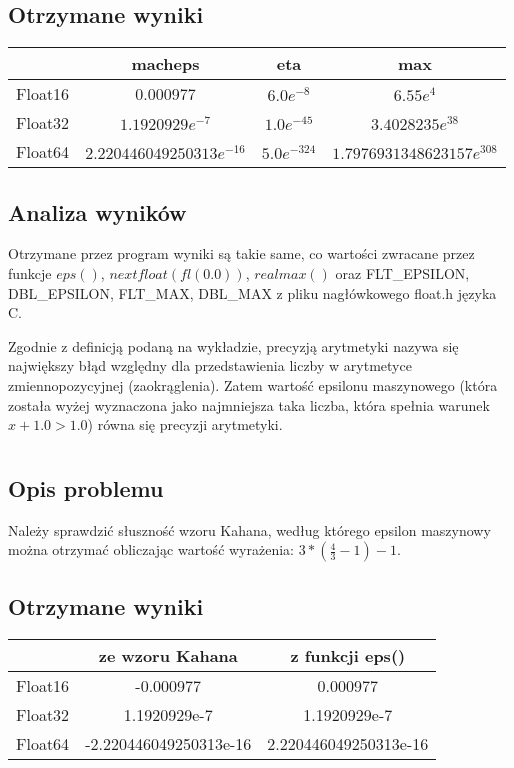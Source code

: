\documentclass[11pt]{article}
\theoremstyle{remark}
\begin{document}
\subsection{Otrzymane wyniki}
\begin{center}
\begin{tabular}{ |c|c|c|c| } 
 \hline
  & macheps & eta & max \\ 
  \hline
 Float16 & 0.000977 &  $6.0e^{-8}$ & $6.55e^4$\\ 
 Float32 & $1.1920929e^{-7}$ & $1.0e^{-45}$ & $3.4028235e^{38}$\\
 Float64 & $2.220446049250313e^{-16}$ & $5.0e^{-324}$ & $1.7976931348623157e^{308}$\\
 \hline
\end{tabular}
\end{center}
\subsection{Analiza wyników}
Otrzymane przez program wyniki są takie same, co wartości zwracane przez funkcje $eps()$, $nextfloat(fl(0.0))$, $realmax()$ oraz FLT\_EPSILON, DBL\_EPSILON, FLT\_MAX, DBL\_MAX z pliku nagłówkowego float.h języka C.

Zgodnie z definicją podaną na wykładzie, precyzją arytmetyki nazywa się największy błąd względny dla przedstawienia liczby w arytmetyce zmiennopozycyjnej (zaokrąglenia). Zatem wartość epsilonu maszynowego (która została wyżej wyznaczona jako najmniejsza taka liczba, która spełnia warunek $x+1.0>1.0$) równa się precyzji arytmetyki. 
\section{}
\subsection{Opis problemu}
Należy sprawdzić słuszność wzoru Kahana, według którego epsilon maszynowy można otrzymać obliczając wartość wyrażenia: $3*(\frac{4}{3}-1)-1$. 
\subsection{Otrzymane wyniki}
\begin{center}
\begin{tabular}{ |c|c|c| } 
 \hline
  & ze wzoru Kahana & z funkcji eps() \\ 
  \hline
 Float16 & -0.000977 &  0.000977 \\ 
 Float32 & 1.1920929e-7 & 1.1920929e-7\\
 Float64 & -2.220446049250313e-16 & 2.220446049250313e-16\\
 \hline
\end{tabular}
\end{center}
\end{document}
